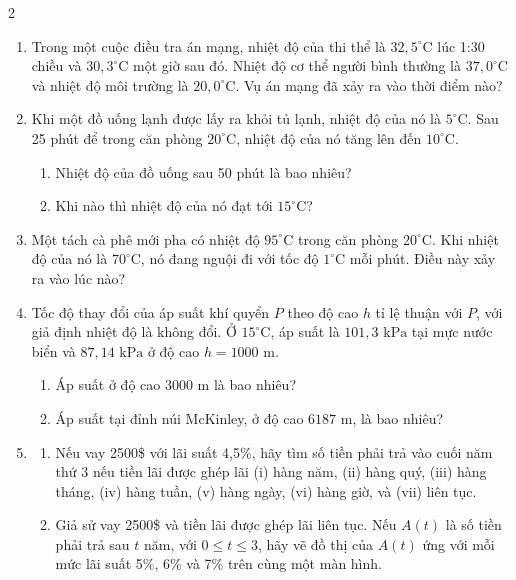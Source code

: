 \begin{paracol}{2}
\begin{enumerate}[label=\textbf{\arabic*.},leftmargin=*,itemsep=9pt,topsep=0pt,parsep=2pt]
  \item Trong một cuộc điều tra án mạng, nhiệt độ của thi thể là $32{,}5^\circ\text{C}$ lúc 1:30 chiều và $30{,}3^\circ\text{C}$ một giờ sau đó. Nhiệt độ cơ thể người bình thường là $37{,}0^\circ\text{C}$ và nhiệt độ môi trường là $20{,}0^\circ\text{C}$. Vụ án mạng đã xảy ra vào thời điểm nào?

  \item Khi một đồ uống lạnh được lấy ra khỏi tủ lạnh, nhiệt độ của nó là $5^\circ\text{C}$. Sau 25 phút để trong căn phòng $20^\circ\text{C}$, nhiệt độ của nó tăng lên đến $10^\circ\text{C}$.
    \begin{enumerate}[label=\textbf{(\alph*)},leftmargin=1.5em,itemsep=1.5pt,topsep=1.5pt]
      \item Nhiệt độ của đồ uống sau 50 phút là bao nhiêu?
      \item Khi nào thì nhiệt độ của nó đạt tới $15^\circ\text{C}$?
    \end{enumerate}

  \item Một tách cà phê mới pha có nhiệt độ $95^\circ\text{C}$ trong căn phòng $20^\circ\text{C}$. Khi nhiệt độ của nó là $70^\circ\text{C}$, nó đang nguội đi với tốc độ $1^\circ\text{C}$ mỗi phút. Điều này xảy ra vào lúc nào?

  \item Tốc độ thay đổi của áp suất khí quyển $P$ theo độ cao $h$ tỉ lệ thuận với $P$, với giả định nhiệt độ là không đổi. Ở $15^\circ\text{C}$, áp suất là $101{,}3\text{ kPa}$ tại mực nước biển và $87{,}14\text{ kPa}$ ở độ cao $h = 1000\text{ m}$.
    \begin{enumerate}[label=\textbf{(\alph*)},leftmargin=1.5em,itemsep=1.5pt,topsep=1.5pt]
      \item Áp suất ở độ cao $3000\text{ m}$ là bao nhiêu?
      \item Áp suất tại đỉnh núi McKinley, ở độ cao $6187\text{ m}$, là bao nhiêu?
    \end{enumerate}

  \item
    \begin{enumerate}[label=\textbf{(\alph*)},leftmargin=1.5em,itemsep=3pt,topsep=0pt]
      \item Nếu vay 2500\$ với lãi suất 4,5\%, hãy tìm số tiền phải trả vào cuối năm thứ 3 nếu tiền lãi được ghép lãi (i) hàng năm, (ii) hàng quý, (iii) hàng tháng, (iv) hàng tuần, (v) hàng ngày, (vi) hàng giờ, và (vii) liên tục.
      \item \llap{\calcicon\hspace{4pt}}Giả sử vay 2500\$ và tiền lãi được ghép lãi liên tục. Nếu $A(t)$ là số tiền phải trả sau $t$ năm, với $0 \leqslant t \leqslant 3$, hãy vẽ đồ thị của $A(t)$ ứng với mỗi mức lãi suất 5\%, 6\% và 7\% trên cùng một màn hình.
    \end{enumerate}


\end{enumerate}
\end{paracol}

